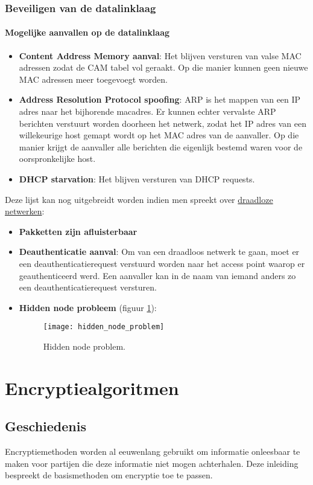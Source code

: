 \documentclass{report}
\begin{document}
	\subsection{Beveiligen van de datalinklaag}
	\subsubsection{Mogelijke aanvallen op de datalinklaag}
	\begin{itemize}
		\item \textbf{Content Address Memory aanval}: Het blijven versturen van valse MAC adressen zodat de CAM tabel vol geraakt. Op die manier kunnen geen nieuwe MAC adressen meer toegevoegt worden.
		\item \textbf{Address Resolution Protocol spoofing}: ARP is het mappen van een IP adres naar het bijhorende macadres. Er kunnen echter vervalste ARP berichten verstuurt worden doorheen het netwerk, zodat het IP adres van een willekeurige host gemapt wordt op het MAC adres van de aanvaller. Op die manier krijgt de aanvaller alle berichten die eigenlijk bestemd waren voor de oorspronkelijke host. 
		\item \textbf{DHCP starvation}: Het blijven versturen van DHCP requests.
	\end{itemize}
	Deze lijst kan nog uitgebreidt worden indien men spreekt over \underline{draadloze netwerken}:
	\begin{itemize}
		\item \textbf{Pakketten zijn afluisterbaar}
		\item \textbf{Deauthenticatie aanval}: Om van een draadloos netwerk te gaan, moet er een deauthenticatierequest verstuurd worden naar het access point waarop er geauthenticeerd werd. Een aanvaller kan in de naam van iemand anders zo een deauthenticatierequest versturen.
		\item \textbf{Hidden node probleem} (figuur \ref{fig:hidden_node_problem}):
		\begin{figure}[ht]
			\texttt{[image: hidden\_node\_problem]}
			\caption{Hidden node problem.}
			\label{fig:hidden_node_problem}
		\end{figure}
	\end{itemize}


	\chapter{Encryptiealgoritmen}
	\section{Geschiedenis}
	Encryptiemethoden worden al eeuwenlang gebruikt om informatie onleesbaar te maken voor partijen die deze informatie niet mogen achterhalen. Deze inleiding bespreekt de basismethoden om encryptie toe te passen.
	
\end{document}
